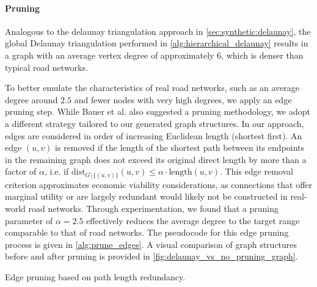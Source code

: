 \paragraph{Pruning}
\label{sec:synthetic:hierarchical_delaunay:pruning}


Analogous to the delaunay triangulation approach in \cref{sec:synthetic:delaunay}, the global Delaunay triangulation performed in \cref{alg:hierarchical_delaunay} results in a graph with an average vertex degree of approximately 6, which is denser than typical road networks.

To better emulate the characteristics of real road networks, such as an average degree around \(2.5\) and fewer nodes with very high degrees, we apply an edge pruning step.
While Bauer et al. \cite{hutchison_synthetic_2010} also suggested a pruning methodology, we adopt a different strategy tailored to our generated graph structures.
In our approach, edges are considered in order of increasing Euclidean length (shortest first).
An edge \((u,v)\) is removed if the length of the shortest path between its endpoints in the remaining graph does not exceed its original direct length by more than a factor of \(\alpha\), i.e. if \( \text{dist}_{G \setminus \{(u,v)\}}(u,v) \le \alpha \cdot \text{length}(u,v) \).
This edge removal criterion approximates economic viability considerations, as connections that offer marginal utility or are largely redundant would likely not be constructed in real-world road networks.
Through experimentation, we found that a pruning parameter of \(\alpha = 2.5\) effectively reduces the average degree to the target range comparable to that of road networks.
The pseudocode for this edge pruning process is given in \cref{alg:prune_edges}.
A visual comparison of graph structures before and after pruning is provided in \cref{fig:delaunay_vs_no_pruning_graph}.

\begin{algorithm}[tbhp]
	\BlankLine
	\caption{Edge pruning based on path length redundancy.}
	\label{alg:prune_edges}
\end{algorithm}

